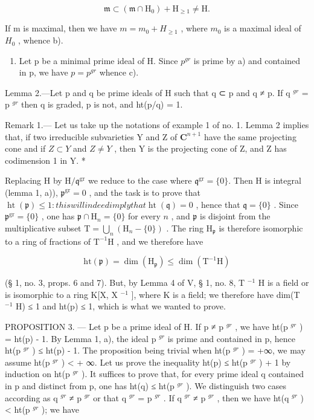 \[
\mathfrak {m} \subset (\mathfrak {m} \cap \mathrm{H} _ {0}) + \mathrm{H} _ {\geqslant 1} \neq \mathrm{H}.
\]

If m is maximal, then we have \(m = m_{0} + H_{\geq 1}\) , where \(m_{0}\) is a maximal ideal of \(H_{0}\) , whence b).

\begin{enumerate}
\def\labelenumi{\alph{enumi})}
\setcounter{enumi}{2}
\tightlist
\item
  Let p be a minimal prime ideal of H. Since \(p^{gr}\) is prime by a) and contained in p, we have \(p = p^{gr}\) whence c).
\end{enumerate}

Lemma 2.---Let p and q be prime ideals of H such that q ⊂ p and q ≠ p. If q \(^{gr}\) = p \(^{gr}\) then q is graded, p is not, and ht(p/q) = 1.

Remark 1.--- Let us take up the notations of example 1 of no. 1. Lemma 2 implies that, if two irreducible subvarieties Y and Z of \(\mathbf{C}^{n+1}\) have the same projecting cone and if \(Z \subset Y\) and \(Z \neq Y\) , then Y is the projecting cone of Z, and Z has codimension 1 in Y. *

Replacing H by \(\mathrm{H} / \mathfrak{q}^{\mathrm{gr}}\) we reduce to the case where \(\mathfrak{q}^{\mathrm{gr}} = \{0\}\). Then H is integral (lemma 1, a)), \(\mathfrak{p}^{\mathrm{gr}} = 0\) , and the task is to prove that \(\operatorname{ht}(\mathfrak{p}) \leqslant 1: this will indeed imply that  \operatorname{ht}(\mathfrak{q}) = 0\) , hence that \(\mathfrak{q} = \{0\}\) . Since \(\mathfrak{p}^{\mathrm{gr}} = \{0\}\) , one has \(\mathfrak{p} \cap \mathrm{H}_n = \{0\}\) for every \(n\) , and \(\mathfrak{p}\) is disjoint from the multiplicative subset \(\mathrm{T} = \bigcup_{n} (\mathrm{H}_n - \{0\})\) . The ring \(\mathrm{H}_{\mathfrak{p}}\) is therefore isomorphic to a ring of fractions of \(\mathrm{T}^{-1}\mathrm{H}\) , and we therefore have

\[
\mathrm{ht} (\mathfrak {p}) = \dim (\mathrm{H} _ {\mathfrak {p}}) \leqslant \dim (\mathrm{T} ^ {- 1} \mathrm{H})
\]

(§ 1, no. 3, props. 6 and 7). But, by Lemma 4 of V, § 1, no. 8, T \(^{-1}\) H is a field or is isomorphic to a ring K{[}X, X \(^{-1}\) {]}, where K is a field; we therefore have dim(T \(^{-1}\) H) ≤ 1 and ht(p) ≤ 1, which is what we wanted to prove.

PROPOSITION 3. --- Let p be a prime ideal of H. If p ≠ p \(^{gr}\) , we have ht(p \(^{gr}\) ) = ht(p) - 1. By Lemma 1, a), the ideal p \(^{gr}\) is prime and contained in p, hence ht(p \(^{gr}\) ) ≤ ht(p) - 1. The proposition being trivial when ht(p \(^{gr}\) ) = +∞, we may assume ht(p \(^{gr}\) ) \textless{} + ∞. Let us prove the inequality ht(p) ≤ ht(p \(^{gr}\) ) + 1 by induction on ht(p \(^{gr}\) ). It suffices to prove that, for every prime ideal q contained in p and distinct from p, one has ht(q) ≤ ht(p \(^{gr}\) ). We distinguish two cases according as q \(^{gr}\) ≠ p \(^{gr}\) or that q \(^{gr}\) = p \(^{gr}\) . If q \(^{gr}\) ≠ p \(^{gr}\) , then we have ht(q \(^{gr}\) ) \textless{} ht(p \(^{gr}\) ); we have

